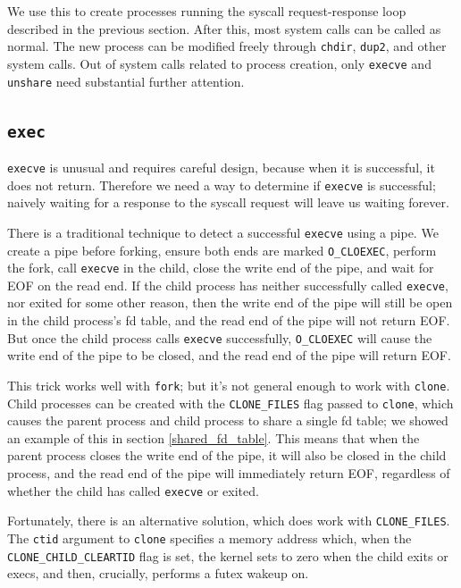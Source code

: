 \documentclass[letterpaper,twocolumn,10pt]{article}
\begin{document}
We use this to create processes running the syscall request-response loop described in the previous section.
After this,
most system calls can be called as normal.
The new process can be modified freely through \texttt{chdir}, \texttt{dup2}, and other system calls.
Out of system calls related to process creation,
only \texttt{execve} and \texttt{unshare} need substantial further attention.
\subsection{\texttt{exec}}
\texttt{execve} is unusual and requires careful design,
because when it is successful, it does not return.
Therefore we need a way to determine if \texttt{execve} is successful;
naively waiting for a response to the syscall request will leave us waiting forever.

There is a traditional technique to detect a successful \texttt{execve} using a pipe.
We create a pipe before forking,
ensure both ends are marked \verb|O_CLOEXEC|,
perform the fork,
call \texttt{execve} in the child,
close the write end of the pipe,
and wait for EOF on the read end.
If the child process has neither successfully called \texttt{execve}, nor exited for some other reason,
then the write end of the pipe will still be open in the child process's fd table,
and the read end of the pipe will not return EOF.
But once the child process calls \texttt{execve} successfully,
\verb|O_CLOEXEC| will cause the write end of the pipe to be closed,
and the read end of the pipe will return EOF.

This trick works well with \texttt{fork};
but it's not general enough to work with \texttt{clone}.
Child processes can be created with the \verb|CLONE_FILES| flag passed to \texttt{clone},
which causes the parent process and child process to share a single fd table;
we showed an example of this in section \ref{shared_fd_table}.
This means that when the parent process closes the write end of the pipe,
it will also be closed in the child process,
and the read end of the pipe will immediately return EOF,
regardless of whether the child has called \texttt{execve} or exited.

Fortunately, there is an alternative solution, which does work with \verb|CLONE_FILES|.
The \texttt{ctid} argument to \texttt{clone} specifies a memory address which,
when the \verb|CLONE_CHILD_CLEARTID| flag is set,
the kernel sets to zero when the child exits or execs,
and then, crucially, performs a futex wakeup on.
\end{document}
